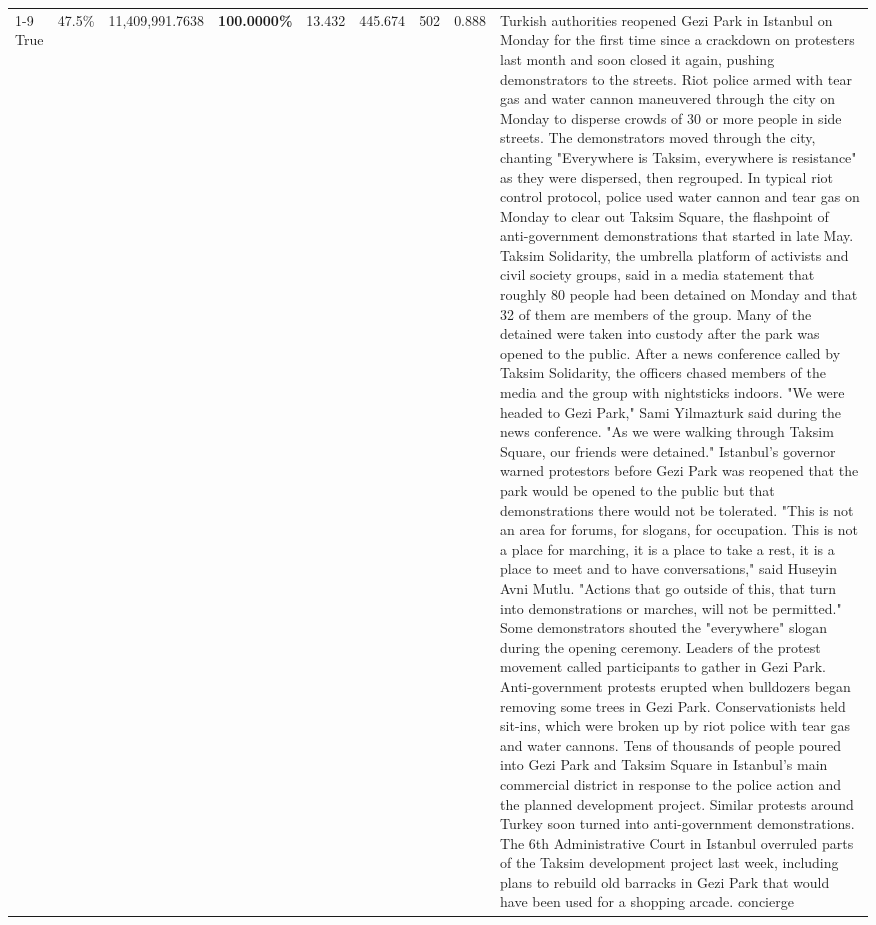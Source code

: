 \begin{table}[H]
\begin{tabular}{lllrlllll}
\cline{1-9}
True & 47.5\% & 11,409,991.7638 & \bfseries \color{red} 100.0000\% & 13.432 & 445.674 & 502 & 0.888 & Turkish authorities reopened Gezi Park in Istanbul on Monday for the first time since a crackdown on protesters last month and soon closed it again, pushing demonstrators to the streets. Riot police armed with tear gas and water cannon maneuvered through the city on Monday to disperse crowds of 30 or more people in side streets. The demonstrators moved through the city, chanting "Everywhere is Taksim, everywhere is resistance" as they were dispersed, then regrouped. In typical riot control protocol, police used water cannon and tear gas on Monday to clear out Taksim Square, the flashpoint of anti-government demonstrations that started in late May. Taksim Solidarity, the umbrella platform of activists and civil society groups, said in a media statement that roughly 80 people had been detained on Monday and that 32 of them are members of the group. Many of the detained were taken into custody after the park was opened to the public. After a news conference called by Taksim Solidarity, the officers chased members of the media and the group with nightsticks indoors. "We were headed to Gezi Park," Sami Yilmazturk said during the news conference. "As we were walking through Taksim Square, our friends were detained." Istanbul's governor warned protestors before Gezi Park was reopened that the park would be opened to the public but that demonstrations there would not be tolerated. "This is not an area for forums, for slogans, for occupation. This is not a place for marching, it is a place to take a rest, it is a place to meet and to have conversations," said Huseyin Avni Mutlu. "Actions that go outside of this, that turn into demonstrations or marches, will not be permitted." Some demonstrators shouted the "everywhere" slogan during the opening ceremony. Leaders of the protest movement called participants to gather in Gezi Park. Anti-government protests erupted when bulldozers began removing some trees in Gezi Park. Conservationists held sit-ins, which were broken up by riot police with tear gas and water cannons. Tens of thousands of people poured into Gezi Park and Taksim Square in Istanbul's main commercial district in response to the police action and the planned development project. Similar protests around Turkey soon turned into anti-government demonstrations. The 6th Administrative Court in Istanbul overruled parts of the Taksim development project last week, including plans to rebuild old barracks in Gezi Park that would have been used for a shopping arcade. concierge \\

\end{tabular}
\end{table}
